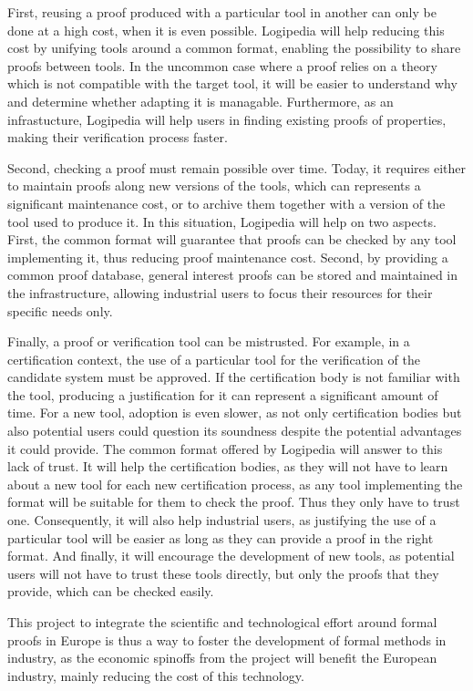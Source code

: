 First, reusing a proof produced with a particular tool in another
can only be done at a high cost, when it is even possible.
Logipedia will help reducing this cost by unifying tools
around a common format, enabling the possibility to share proofs
between tools. In the uncommon case where a proof relies on a theory
which is not compatible with the target tool, it will be easier to
understand why and determine whether adapting it is managable.
Furthermore, as an infrastucture, Logipedia will help users
in finding existing proofs of properties, making their verification
process faster.

Second, checking a proof must remain possible over time. Today, it
requires either to maintain proofs along new versions of the tools,
which can represents a significant maintenance cost, or to archive
them together with a version of the tool used to produce it. In this
situation, Logipedia will help on two aspects. First, the
common format will guarantee that proofs can be checked by any tool
implementing it, thus reducing proof maintenance cost. Second, by
providing a common proof database, general interest proofs can be
stored and maintained in the infrastructure, allowing industrial users
to focus their resources for their specific needs only.

Finally, a proof or verification tool can be mistrusted. For example,
in a certification context, the use of a particular tool for the
verification of the candidate system must be approved. If the
certification body is not familiar with the tool, producing a
justification for it can represent a significant amount of time. For
a new tool, adoption is even slower, as not only certification
bodies but also potential users could question its soundness despite
the potential advantages it could provide. The common format offered
by Logipedia will answer to this lack of trust. It will help
the certification bodies, as they will not have to learn about a new
tool for each new certification process, as any tool implementing
the format will be suitable for them to check the proof. Thus they
only have to trust one. Consequently, it will also help industrial
users, as justifying the use of a particular tool will be easier as
long as they can provide a proof in the right format. And finally, it
will encourage the development of new tools, as potential users will
not have to trust these tools directly, but only the proofs that they
provide, which can be checked easily.

This project to integrate the scientific and technological effort
around formal proofs in Europe is thus a way to foster the
development of formal methods in industry, as the economic spinoffs
from the project will benefit the European industry, mainly reducing
the cost of this technology.

